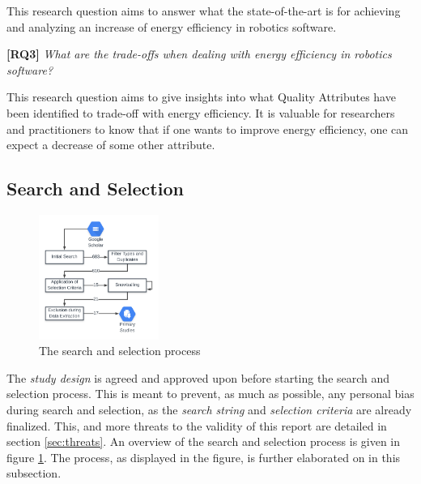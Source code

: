 \vspace{5mm}

This research question aims to answer what the state-of-the-art is for achieving and analyzing an increase of energy efficiency in robotics software.

\vspace{5mm}

\textbf{[RQ3]} \textit{What are the trade-offs when dealing with energy efficiency in robotics software?}

\vspace{5mm}

This research question aims to give insights into what Quality Attributes have been identified to trade-off with energy efficiency. 
It is valuable for researchers and practitioners to know that if one wants to improve energy efficiency, 
one can expect a decrease of some other attribute.

\subsection{Search and Selection}
\label{sec:study_design:search_selection}
\begin{figure}
    \centering
    \includegraphics[width=0.35\textwidth]{figures/selection_process_var2.png}
    \caption{The search and selection process}
    \label{fig:search_selec_process}
\end{figure}
 
The \textit{study design} is agreed and approved upon before starting the search and selection process. 
This is meant to prevent, as much as possible, any personal bias during search and selection, as the \textit{search string} and \textit{selection criteria} are already finalized.
This, and more threats to the validity of this report are detailed in section \ref{sec:threats}.
An overview of the search and selection process is given in figure \ref{fig:search_selec_process}.
The process, as displayed in the figure, is further elaborated on in this subsection.

